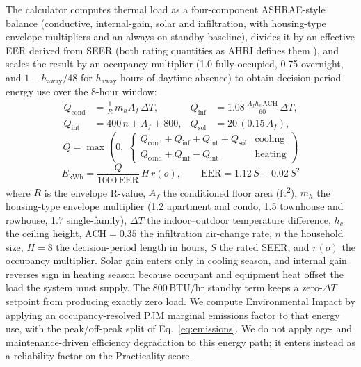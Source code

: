 \documentclass[final,3p,times]{elsarticle}
\begin{document}
The calculator computes thermal load as a four-component ASHRAE-style balance \cite{accamanualj} (conductive, internal-gain, solar and infiltration, with housing-type envelope multipliers and an always-on standby baseline), divides it by an effective EER derived from SEER (both rating quantities as AHRI defines them \cite{ahri2008}), and scales the result by an occupancy multiplier (1.0 fully occupied, 0.75 overnight, and $1 - h_{\mathrm{away}}/48$ for $h_{\mathrm{away}}$ hours of daytime absence) to obtain decision-period energy use over the 8-hour window:
\begin{equation}
\begin{aligned}
  Q_{\mathrm{cond}} &= \tfrac{1}{R}\,m_h A_f\,\Delta T, &
  Q_{\mathrm{inf}}  &= 1.08\,\tfrac{A_f h_c\,\mathrm{ACH}}{60}\,\Delta T, \\[2pt]
  Q_{\mathrm{int}}  &= 400\,n + A_f + 800, &
  Q_{\mathrm{sol}}  &= 20\,(0.15\,A_f),
\end{aligned}
  \label{eq:hvac_load}
\end{equation}
\begin{equation}
  Q = \max\!\left(0,\;
  \begin{cases}
    Q_{\mathrm{cond}} + Q_{\mathrm{inf}} + Q_{\mathrm{int}} + Q_{\mathrm{sol}} & \text{cooling} \\[3pt]
    Q_{\mathrm{cond}} + Q_{\mathrm{inf}} - Q_{\mathrm{int}}                    & \text{heating}
  \end{cases}\right)
  \label{eq:hvac_load_total}
\end{equation}
\begin{equation}
  E_{\mathrm{kWh}} = \frac{Q}{1000\,\mathrm{EER}}\,H\,r(o),
  \qquad
  \mathrm{EER} = 1.12\,S - 0.02\,S^{2}
  \label{eq:hvac_energy}
\end{equation}
\noindent where $R$ is the envelope R-value, $A_f$ the conditioned floor area (ft\textsuperscript{2}), $m_h$ the housing-type envelope multiplier (1.2 apartment and condo, 1.5 townhouse and rowhouse, 1.7 single-family), $\Delta T$ the indoor--outdoor temperature difference, $h_c$ the ceiling height, $\mathrm{ACH}=0.35$ the infiltration air-change rate, $n$ the household size, $H=8$ the decision-period length in hours, $S$ the rated SEER, and $r(o)$ the occupancy multiplier. Solar gain enters only in cooling season, and internal gain reverses sign in heating season because occupant and equipment heat offset the load the system must supply. The 800\,BTU/hr standby term keeps a zero-$\Delta T$ setpoint from producing exactly zero load. We compute Environmental Impact by applying an occupancy-resolved PJM marginal emissions factor to that energy use, with the peak/off-peak split of Eq.~\ref{eq:emissions}. We do not apply age- and maintenance-driven efficiency degradation to this energy path; it enters instead as a reliability factor on the Practicality score.
\end{document}
